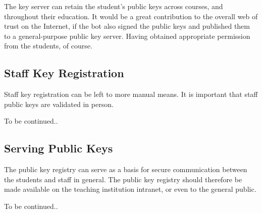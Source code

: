The key server can retain the student's public keys across courses, and
throughout their education. It would be a great contribution to the overall web
of trust on the Internet, if the bot also signed the public keys and published
them to a general-purpose public key server. Having obtained appropriate
permission from the students, of course.

\subsection{Staff Key Registration}

Staff key registration can be left to more manual means. It is important that
staff public keys are validated in person.

To be continued..

\subsection{Serving Public Keys}

The public key registry can serve as a basis for secure communication between
the students and staff in general. The public key registry should therefore be
made available on the teaching institution intranet, or even to the general
public.

To be continued..
